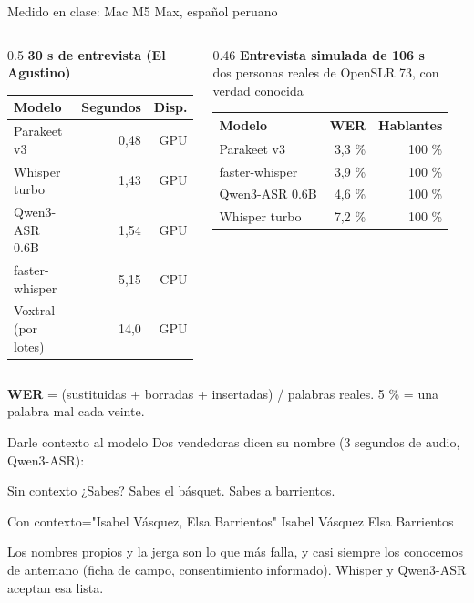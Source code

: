 \documentclass[aspectratio=169,11pt]{beamer}
\newcommand{\cod}[1]{{\small\ttfamily #1}}
\begin{document}
\begin{frame}{Medido en clase: Mac M5 Max, español peruano}
  \begin{columns}[T]
    \begin{column}{0.5\textwidth}
      \textbf{30 s de entrevista (El Agustino)}\\[3pt]
      \small
      \begin{tabular}{lrr}
        \toprule
        Modelo & Segundos & Disp. \\
        \midrule
        Parakeet v3 & 0,48 & GPU \\
        Whisper turbo & 1,43 & GPU \\
        Qwen3-ASR 0.6B & 1,54 & GPU \\
        faster-whisper & 5,15 & CPU \\
        Voxtral (por lotes) & 14,0 & GPU \\
        \bottomrule
      \end{tabular}
    \end{column}
    \begin{column}{0.46\textwidth}
      \textbf{Entrevista simulada de 106 s}\\
      \scriptsize dos personas reales de OpenSLR 73, con verdad conocida\\[3pt]
      \small
      \begin{tabular}{lrr}
        \toprule
        Modelo & WER & Hablantes \\
        \midrule
        Parakeet v3 & 3,3 \% & 100 \% \\
        faster-whisper & 3,9 \% & 100 \% \\
        Qwen3-ASR 0.6B & 4,6 \% & 100 \% \\
        Whisper turbo & 7,2 \% & 100 \% \\
        \bottomrule
      \end{tabular}
    \end{column}
  \end{columns}
  \vspace{8pt}
  \small \textbf{WER} = (sustituidas + borradas + insertadas) / palabras reales. 5 \% = una palabra mal cada veinte.
\end{frame}

\begin{frame}{Darle contexto al modelo}
  Dos vendedoras dicen su nombre (3 segundos de audio, Qwen3-ASR):
  \vspace{6pt}
  \begin{block}{Sin contexto}
    \ttfamily ¿Sabes? Sabes el básquet. Sabes a barrientos.
  \end{block}
  \begin{block}{Con \cod{contexto="Isabel Vásquez, Elsa Barrientos"}}
    \ttfamily Isabel Vásquez Elsa Barrientos
  \end{block}
  \vspace{6pt}
  \small Los nombres propios y la jerga son lo que más falla, y casi siempre los conocemos de antemano
  (ficha de campo, consentimiento informado). Whisper y Qwen3-ASR aceptan esa lista.
\end{frame}
\end{document}
